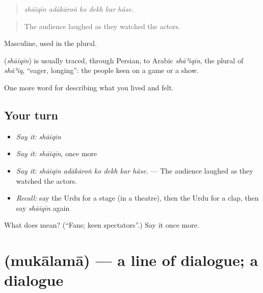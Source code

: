 \begin{quote}
     
\end{quote}

\begin{quote}
\emph{shāiqīn adākāroṅ ko dekh kar hãse.}
\end{quote}

\begin{quote}
The audience laughed as they watched the actors.
\end{quote}

Masculine, used in the plural.

\begin{cousinweb}
\textbf{} (\emph{shāiqīn}) is usually traced, through Persian, to Arabic \emph{shāʾiqīn}, the plural of \emph{shāʾiq}, \textquotedblleft{}eager, longing\textquotedblright{}: the people keen on a game or a show.
\end{cousinweb}

\begin{grammarlens}[title={What you've built}]
One more word for describing what you lived and felt.
\end{grammarlens}

\subsection*{Your turn}
\begin{itemize}
\raggedright
  \item \emph{Say it:} \emph{shāiqīn}
  \item \emph{Say it:} \emph{shāiqīn}, once more
  \item \emph{Say it:} \emph{shāiqīn adākāroṅ ko dekh kar hãse.} — The audience laughed as they watched the actors.
  \item \emph{Recall:} say the Urdu for a stage (in a theatre), then the Urdu for a clap, then say \emph{shāiqīn} again
\end{itemize}

\begin{tcolorbox}[breakable,colback=teal!4,colframe=teal!35!black,title={Before you move on}]
What does  mean? (\textquotedblleft{}Fans; keen spectators\textquotedblright{}.) Say it once more.
\end{tcolorbox}
\section[\texorpdfstring{\ur{مکالمہ} (mukālamā)}{مکالمہ (mukālamā)}]{ (mukālamā) — a line of dialogue; a dialogue}


